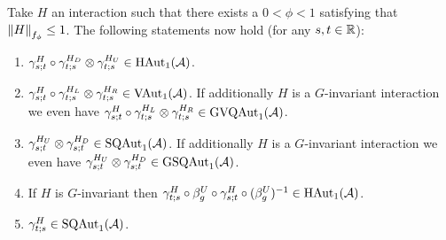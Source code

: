 \documentclass[12pt,a4paper,twoside]{article}
\numberwithin{equation}{section}
\begin{document}
\begin{lemma}\label{lem:PropertiesLocallyGeneratedAutomorphisms}
	Take $H$ an interaction such that there exists a $0<\phi<1$ satisfying that $\norm{H}_{f_\phi}\leq 1$. The following statements now hold (for any $s,t\in\RR$):
	\begin{enumerate}
		\item $\gamma^H_{s;t}\circ\gamma^{H_D}_{t;s}\otimes\gamma^{H_U}_{t;s}\in\textrm{HAut}_1(\AA)$.
		\item $\gamma^H_{s;t}\circ\gamma^{H_L}_{t;s}\otimes\gamma^{H_R}_{t;s}\in\textrm{VAut}_1(\AA)$. If additionally $H$ is a $G$-invariant interaction we even have $\gamma^H_{s;t}\circ\gamma^{H_L}_{t;s}\otimes\gamma^{H_R}_{t;s}\in\textrm{GVQAut}_1(\AA)$.
		\item $\gamma^{H_U}_{s;t}\otimes\gamma^{H_D}_{s;t}\in\textrm{SQAut}_1(\AA)$. If additionally $H$ is a $G$-invariant interaction we even have $\gamma^{H_U}_{s;t}\otimes\gamma^{H_D}_{s;t}\in\textrm{GSQAut}_1(\AA)$.
		\item If $H$ is $G$-invariant then $\gamma^{H}_{t;s}\circ\beta_g^U\circ\gamma^{H}_{s;t}\circ(\beta_g^U)^{-1}\in\textrm{HAut}_1(\AA)$.
		\item $\gamma^{H}_{t;s}\in\textrm{SQAut}_1(\AA)$.
	\end{enumerate}
\end{lemma}
\end{document}
